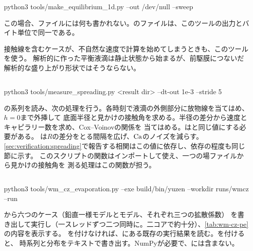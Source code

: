 \begin{shell}
python3 tools/make_equilibrium_1d.py --out /dev/null --sweep
\end{shell}

この場合、ファイルには何も書かれない。のファイルは、このツールの出力とバイト単位で同一である。

接触線を含むケースが、不自然な速度で計算を始めてしまうときも、このツールを使う。
解析的に作った平衡液滴は静止状態から始まるが、前駆膜につないだ解析的な盛り上がり形状ではそうならない。

\subsection{}

\begin{shell}
python3 tools/measure_spreading.py <result dir> --dt-out 1e-3 --stride 5
\end{shell}

の系列を読み、次の処理を行う。各時刻で液滴の外側部分に放物線を当てはめ、$h = 0$まで外挿して
底面半径と見かけの接触角を求める。半径の差分から速度とキャピラリー数を求め、Cox--Voinovの関係を
当てはめる。はと同じ値にする必要がある。
は$R$の差分をとる間隔を広げ、$\mathrm{Ca}$のノイズを減らす。
\cref{sec:verification:spreading}で報告する相関はこの値に依存し、依存の程度も同じ節に示す。
このスクリプトの関数はインポートして使え、一つの場ファイルから見かけの接触角を
測る処理はこの関数が担う。

\subsection{}

\begin{shell}
python3 tools/wm_cz_evaporation.py --exe build/bin/yuzen --workdir runs/wmcz --run
\end{shell}

から六つのケース（鉛直一様モデルとモデル、それぞれ三つの拡散係数）
を書き出して実行し（一スレッドずつ二つ同時に。二コアで約十分）、\cref{tab:wm-cz-pe}の内容を表示する。
を付けなければ、にある既存の実行結果を読む。を付けると、
時系列と分布をテキストで書き出す。NumPyが必要で、には含まない。

\subsection{}

